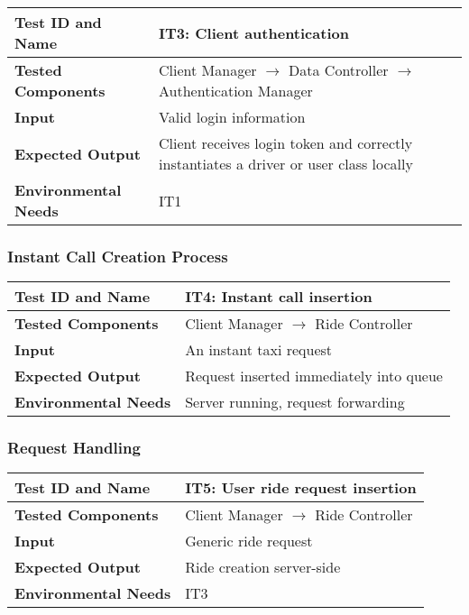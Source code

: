 \begin{tabular}{l p{}}
    \hline
    \textbf{Test ID and Name} & \textbf{IT3: Client authentication}\\
    \hline
    \textbf{Tested Components} & Client Manager $\rightarrow$ Data Controller $\rightarrow$ Authentication Manager\\
    \hline
    \textbf{Input} & Valid login information\\
    \hline
    \textbf{Expected Output} & Client receives login token and correctly instantiates a driver or user class locally\\
    \hline
    \textbf{Environmental Needs} & IT1\\
    \hline
\end{tabular}

\newpage
\subsubsection{Instant Call Creation Process}

\begin{tabular}{l p{}}
    \hline
    \textbf{Test ID and Name} & \textbf{IT4: Instant call insertion}\\
    \hline
    \textbf{Tested Components} & Client Manager $\rightarrow$ Ride Controller\\
    \hline
    \textbf{Input} & An instant taxi request\\
    \hline
    \textbf{Expected Output} & Request inserted immediately into queue\\
    \hline
    \textbf{Environmental Needs} & Server running, request forwarding\\
    \hline
\end{tabular}

\subsubsection{Request Handling}

\begin{tabular}{l p{}}
    \hline
    \textbf{Test ID and Name} & \textbf{IT5: User ride request insertion}\\
    \hline
    \textbf{Tested Components} & Client Manager $\rightarrow$ Ride Controller\\
    \hline
    \textbf{Input} & Generic ride request\\
    \hline
    \textbf{Expected Output} & Ride creation server-side\\
    \hline
    \textbf{Environmental Needs} & IT3\\
    \hline
\end{tabular}

